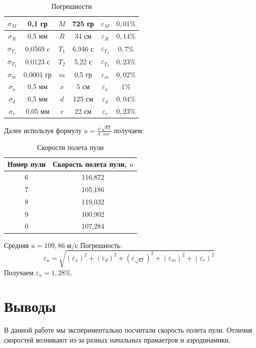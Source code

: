 \documentclass[a4paper]{article}
\begin{document}
\begin{table}[h!]
\begin{center}
\begin{tabular}{|c|c|c|c|c|c|}
\hline
$\sigma_{M}$ & 0,1 гр & $M$ & 725 гр   & $\varepsilon_{M}$ & $0,01\%$  \\ \hline
$\sigma_{R}$ & 0,5 мм & $R$ & 34 см   & $\varepsilon_{R}$ & $0,14\%$ \\ \hline
$\sigma_{T_{1}}$ & 0,0569 c & $T_{1}$ & 6,946 с    & $\varepsilon_{T_{1}}$ & $0,7\%$  \\ \hline
$\sigma_{T_{2}}$ & 0,0123 с  & $T_{2}$ &  5,22 с & $\varepsilon_{T_{2}}$ & $0,23\%$ \\ \hline
$\sigma_{m}$ & 0,0001 гр & $m$ & 0,5 гр   & $\varepsilon_{m}$ & $0,02\%$ \\ \hline
$\sigma_{x}$ & 0,5 мм  & $x$ & 5 см & $\varepsilon_{x}$ & $1\%$ \\ \hline
$\sigma_{d}$ & 0,5 мм  & $d$ & 125 см & $\varepsilon_{d}$ & $0,04\%$ \\ \hline
$\sigma_{r}$ & 0,05 мм  & $r$ & 22 см & $\varepsilon_{r}$ & $0,23\%$ \\ \hline
\end{tabular}
\caption{Погрешности}
\end{center}
\end{table}

Далее используя формулу $u = \frac{x}{d} \frac{\sqrt{kI}}{mr}$ получаем:
\begin{table}[h!]
\begin{center}
\begin{tabular}{|c|c|}
\hline
Номер пули & Скорость полета пули, $u$ \\ \hline
6          & 116,872                   \\ \hline
7          & 105,186                   \\ \hline
8          & 119,032                   \\ \hline
9          & 100,902                   \\ \hline
0          & 107,284                   \\ \hline
\end{tabular}
\caption{Скорости полета пули}
\end{center}
\end{table}

Средняя $\overline{u} = 109,86$ м/с
Погрешность:
\[
    \varepsilon_{u} = \sqrt{\left(\varepsilon_{x}\right)^2 + \left(\varepsilon_{d}\right)^2 + \left(\varepsilon_{\sqrt{kI}}\right)^2 + \left(\varepsilon_{m}\right)^2 + \left(\varepsilon_{r}\right)^2}
\]
Получаем $\varepsilon_{u} = 1,28\%$. 

\section{Выводы}

В данной работе мы экспериментально посчитали скорость полета пули. Отличия скоростей возникают из-за разных начальных прамаетров и аэродинамики.
\end{document}
